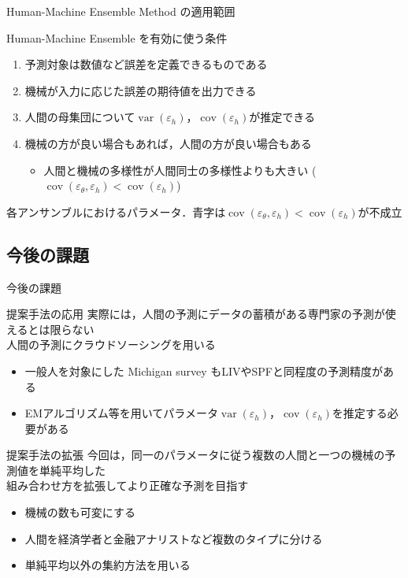 \documentclass[dvipdfmx,aspectratio=169]{beamer}
\DeclareMathOperator{\var}{var}
\DeclareMathOperator{\cov}{cov}
\newcommand{\varh}{\var(\varepsilon_h)}
\newcommand{\covh}{\cov(\varepsilon_h)}
\newcommand{\covmh}{\cov(\varepsilon_\theta, \varepsilon_h)}
\begin{document}
\begin{frame}{Human-Machine Ensemble Method の適用範囲}
\begin{block}{Human-Machine Ensemble を有効に使う条件}
  \begin{enumerate}
    \item 予測対象は数値など誤差を定義できるものである
    \item 機械が入力に応じた誤差の期待値を出力できる
    \item 人間の母集団について$\varh$，$\covh$が推定できる
    \item 機械の方が良い場合もあれば，人間の方が良い場合もある
    \begin{itemize}
      \item 人間と機械の多様性が人間同士の多様性よりも大きい ($\covmh < \covh$)
    \end{itemize}
  \end{enumerate}
\end{block}
\begin{table}
  \caption{各アンサンブルにおけるパラメータ．青字は$\covmh < \covh$が不成立}
  \begin{center}
    \small
    
  \end{center}
\end{table}
\end{frame}

\subsection{今後の課題}

\begin{frame}{今後の課題}
\begin{block}{提案手法の応用}
  実際には，人間の予測にデータの蓄積がある専門家の予測が使えるとは限らない\\
  \structure{$\to$} 人間の予測にクラウドソーシングを用いる
  \begin{itemize}
    \item 一般人を対象にした Michigan survey もLIVやSPFと同程度の予測精度がある
    \item EMアルゴリズム等を用いてパラメータ$\varh$，$\covh$を推定する必要がある
  \end{itemize}
\end{block}
\begin{block}{提案手法の拡張}
  今回は，同一のパラメータに従う複数の人間と一つの機械の予測値を単純平均した\\
  \structure{$\to$} 組み合わせ方を拡張してより正確な予測を目指す
  \begin{itemize}
    \item 機械の数も可変にする
    \item 人間を経済学者と金融アナリストなど複数のタイプに分ける
    \item 単純平均以外の集約方法を用いる
  \end{itemize}
\end{block}
\end{frame}
\end{document}

